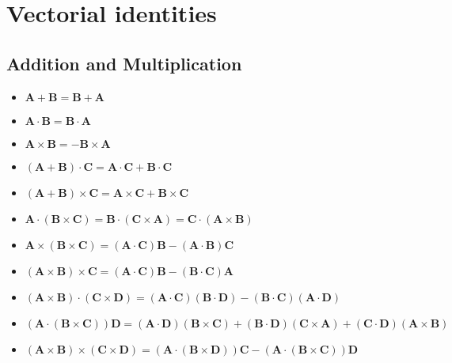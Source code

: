 \section{Vectorial identities}
\subsection{Addition and Multiplication}
\begin{itemize}
\item
  $\mathbf{A}+\mathbf{B}=\mathbf{B}+\mathbf{A}$
\item
  $\mathbf{A}\cdot\mathbf{B}=\mathbf{B}\cdot\mathbf{A}$
\item
  $\mathbf{A}\times\mathbf{B}=\mathbf{-B}\times\mathbf{A}$
\item
  $\left(\mathbf{A}+\mathbf{B}\right)\cdot\mathbf{C}=
  \mathbf{A}\cdot\mathbf{C}+\mathbf{B}\cdot\mathbf{C}$
\item
  $\left(\mathbf{A}+\mathbf{B}\right)\times\mathbf{C}=
  \mathbf{A}\times\mathbf{C}+\mathbf{B}\times\mathbf{C}$
\item
  $\mathbf{A}\cdot\left(\mathbf{B}\times\mathbf{C}\right)=
  \mathbf{B}\cdot\left(\mathbf{C}\times\mathbf{A}\right)=
  \mathbf{C}\cdot\left(\mathbf{A}\times\mathbf{B}\right)$
\item
  $\mathbf{A}\times\left(\mathbf{B}\times\mathbf{C}\right)=
  \left(\mathbf{A}\cdot\mathbf{C}\right)\mathbf{B}
  -\left(\mathbf{A}\cdot\mathbf{B}\right)\mathbf{C}$
\item
  $\left(\mathbf{A}\times\mathbf{B}\right)\times\mathbf{C}=
  \left(\mathbf{A}\cdot\mathbf{C}\right)\mathbf{B}
  -\left(\mathbf{B}\cdot\mathbf{C}\right)\mathbf{A}$
\item
  $\left(\mathbf{A}\times\mathbf{B}\right)
  \cdot\left(\mathbf{C}\times\mathbf{D}\right)=
  \left(\mathbf{A}\cdot\mathbf{C}\right)\left(\mathbf{B}\cdot\mathbf{D}\right)
  -\left(\mathbf{B}\cdot\mathbf{C}\right)\left(\mathbf{A}\cdot\mathbf{D}\right)$
\item
  $\left(\mathbf{A}\cdot\left(\mathbf{B}\times\mathbf{C}\right)\right)\mathbf{D}
  =\left(\mathbf{A}\cdot\mathbf{D}\right)\left(\mathbf{B}\times\mathbf{C}\right)
  +\left(\mathbf{B}\cdot\mathbf{D}\right)\left(\mathbf{C}\times\mathbf{A}\right)
  +\left(\mathbf{C}\cdot\mathbf{D}\right)\left(\mathbf{A}\times\mathbf{B}\right)
  $
\item
  $\left(\mathbf{A}\times\mathbf{B}\right)
  \times\left(\mathbf{C}\times\mathbf{D}\right)
  =\left(\mathbf{A}\cdot\left(\mathbf{B}\times\mathbf{D}\right)\right)\mathbf{C}
  -\left(\mathbf{A}\cdot\left(\mathbf{B}\times\mathbf{C}\right)\right)\mathbf{D}
  $
\end{itemize}

